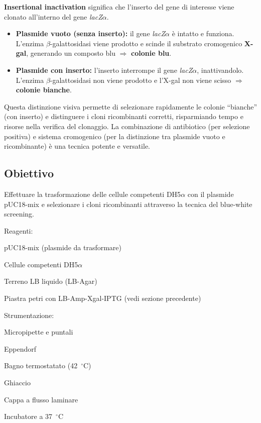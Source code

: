 \textbf{Insertional inactivation} significa che l’inserto del gene di interesse viene clonato all’interno del gene \textit{lacZ$\alpha$}.
\begin{itemize}\footnotesize
	\item \textbf{Plasmide vuoto (senza inserto):} il gene \textit{lacZ$\alpha$} è intatto e funziona. L’enzima $\beta$-galattosidasi viene prodotto e scinde il substrato cromogenico \textbf{X-gal}, generando un composto blu $\Rightarrow$ \textbf{colonie blu}.
	\item \textbf{Plasmide con inserto:} l’inserto interrompe il gene \textit{lacZ$\alpha$}, inattivandolo. L’enzima $\beta$-galattosidasi non viene prodotto e l’X-gal non viene scisso $\Rightarrow$ \textbf{colonie bianche}.
\end{itemize}

\vspace{0.5em}

Questa distinzione visiva permette di selezionare rapidamente le colonie “bianche” (con inserto) e distinguere i cloni ricombinanti corretti, risparmiando tempo e risorse nella verifica del clonaggio.
La combinazione di antibiotico (per selezione positiva) e sistema cromogenico (per la distinzione tra plasmide vuoto e ricombinante) è una tecnica potente e versatile.

\newpage
\subsection{Obiettivo}
Effettuare la trasformazione delle cellule competenti DH5$\alpha$ con il plasmide pUC18-mix e selezionare i cloni ricombinanti attraverso la tecnica del blue-white screening.

\vspace{1em}
\twoColumnLayout
{Reagenti:}
{
	\item pUC18-mix (plasmide da trasformare)
	\item Cellule competenti DH5$\alpha$
	\item Terreno LB liquido (LB-Agar)
	\item Piastra petri con LB-Amp-Xgal-IPTG (vedi sezione precedente)
}
{Strumentazione:}
{
	\item Micropipette e puntali
	\item Eppendorf
	\item Bagno termostatato (42~$^\circ$C)
	\item Ghiaccio
	\item Cappa a flusso laminare
	\item Incubatore a 37~$^\circ$C
}

